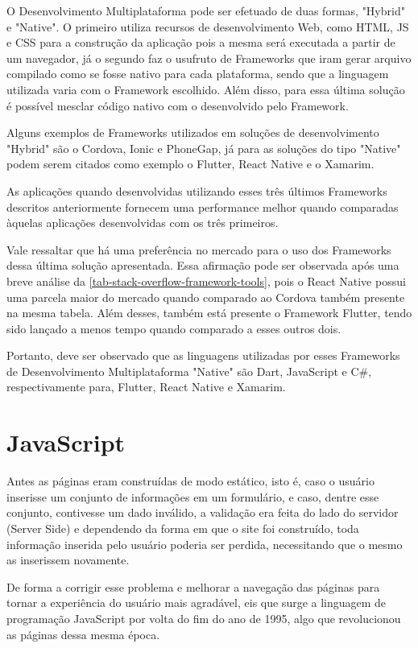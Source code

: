 O Desenvolvimento Multiplataforma pode ser efetuado de duas formas, "Hybrid" e "Native". O primeiro utiliza recursos de desenvolvimento Web, como HTML, JS e CSS para a construção da aplicação pois a mesma será executada a partir de um navegador, já o segundo faz o usufruto de Frameworks que iram gerar arquivo compilado como se fosse nativo para cada plataforma, sendo que a linguagem utilizada varia com o Framework escolhido. Além disso, para essa última solução é possível mesclar código nativo com o desenvolvido pelo Framework.

Alguns exemplos de Frameworks utilizados em soluções de desenvolvimento "Hybrid" são o Cordova, Ionic e PhoneGap, já para as soluções do tipo "Native" podem serem citados como exemplo o Flutter, React Native e o Xamarim.

As aplicações quando desenvolvidas utilizando esses três últimos Frameworks descritos anteriormente fornecem uma performance melhor quando comparadas àquelas aplicações desenvolvidas com os três primeiros.

Vale ressaltar que há uma preferência no mercado para o uso dos Frameworks dessa última solução apresentada. Essa afirmação pode ser observada após uma breve análise da \autoref{tab-stack-overflow-framework-tools}, pois o React Native possui uma parcela maior do mercado quando comparado ao Cordova também presente na mesma tabela. Além desses, também está presente o Framework Flutter, tendo sido lançado a menos tempo quando comparado a esses outros dois.

Portanto, deve ser observado que as linguagens utilizadas por esses Frameworks de Desenvolvimento Multiplataforma "Native" são Dart, JavaScript e C\#, respectivamente para, Flutter, React Native e Xamarim.

\section{JavaScript}\label{JavaScript}

Antes as páginas eram construídas de modo estático, isto é, caso o usuário inserisse um conjunto de informações em um formulário, e caso, dentre esse conjunto, contivesse um dado inválido, a validação era feita do lado do servidor (Server Side) e dependendo da forma em que o site foi construído, toda informação inserida pelo usuário poderia ser perdida, necessitando que o mesmo as inserissem novamente.

De forma a corrigir esse problema e melhorar a navegação das páginas para tornar a experiência do usuário mais agradável, eis que surge a linguagem de programação JavaScript por volta do fim do ano de 1995, algo que revolucionou as páginas dessa mesma época.

